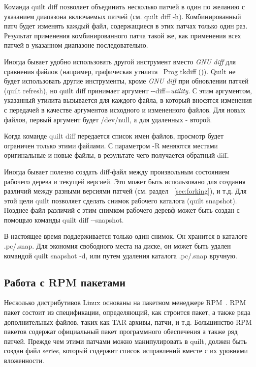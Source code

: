 \documentclass{article}
\newcommand{\quilt}[1]{\textsf{quilt #1}}
\newcommand{\prog}[1]{\textit{#1}}
\begin{document}
Команда \quilt{diff} позволяет объединить несколько патчей в один по желанию с указанием диапазона включаемых патчей (см. \quilt{diff -h}). Комбинированный патч будет изменять каждый файл, содержащиеся в этих патчах только один раз. Результат применения комбинированного патча такой же, как применения всех патчей в указанном диапазоне последовательно.

Иногда бывает удобно использовать другой инструмент вместо \prog{GNU diff} для сравнения файлов (например, графическая утилита \ Prog tkdiff ()). Quilt не будет использовать другие инструменты, кроме \prog{GNU diff} при обновлении патчей (\quilt{refresh}), но \quilt{diff} принимает аргумент \textsf{-{}-diff=\textit{utility}}. С этим аргументом, указанный утилита вызывается для каждого файла, в который вносятся изменения с передачей в качестве аргументов исходного и измененного файлов. Для новых файлов, первый аргумент будет \textsf{/dev/null}, а для удаленных - второй.

Когда команде \quilt{diff} передается список имен файлов, просмотр будет ограничен только этими файлами. С параметром \textsf{-R} меняются местами оригинальные и новые файлы, в результате чего получается обратный diff.

Иногда бывает полезно создать diff-файл между произвольным состоянием рабочего дерева и текущей версией. Это может быть использовано для создания различий между разными версиями патчей (см. раздел ~\ref{sec:forking}), и т.д. Для этой цели quilt позволяет сделать снимок рабочего каталога (\quilt{snapshot}). Позднее файл различий с этим снимком рабочего деревф может быть создан с помощью команды \quilt{diff -{}-snapshot}.

В настоящее время поддерживается только один снимок. Он хранится в каталоге \textsf{.pc/.snap}. Для экономия свободного места на диске, он может быть удален командой \quilt{snapshot -d}, или путем удаления каталога \textsf{.pc/.snap} вручную.

\subsection{Работа с RPM пакетами}
\label{sec:rpm}

Несколько дистрибутивов Linux основаны на пакетном менеджере RPM~\cite{max-rpm}. RPM пакет состоит из спецификации, определяющий, как строится пакет, а также ряда дополнительных файлов, таких как TAR архивы, патчи, и т.д. Большинство RPM пакетов содержат официальный пакет программного обеспечения а также ряд патчей. Прежде чем этими патчами можно манипулировать в quilt, должен быть создан файл \textsf{series}, который содержит список исправлений вместе с их уровнями вложенности.
\end{document}
